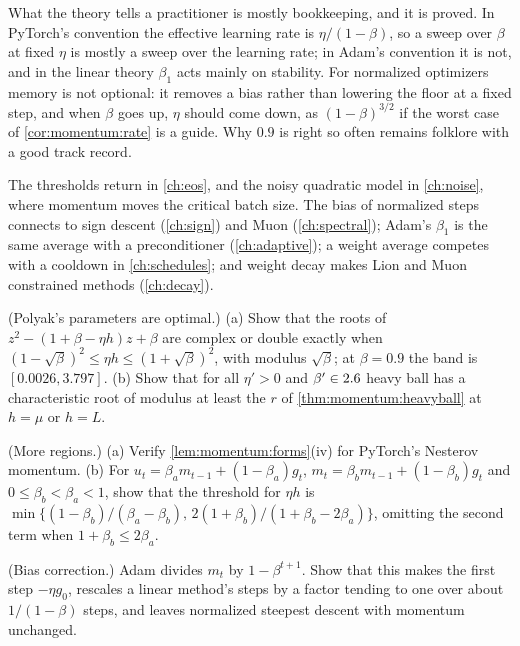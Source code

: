 \begin{refsection}
What the theory tells a practitioner is mostly bookkeeping, and it is proved. In PyTorch's convention the effective learning rate is $\eta/(1-\beta)$, so a sweep over $\beta$ at fixed $\eta$ is mostly a sweep over the learning rate; in Adam's convention it is not, and in the linear theory $\beta_1$ acts mainly on stability. For normalized optimizers memory is not optional: it removes a bias rather than lowering the floor at a fixed step, and when $\beta$ goes up, $\eta$ should come down, as $(1-\beta)^{3/2}$ if the worst case of \cref{cor:momentum:rate} is a guide. Why $0.9$ is right so often remains folklore with a good track record.

The thresholds return in \cref{ch:eos}, and the noisy quadratic model in \cref{ch:noise}, where momentum moves the critical batch size. The bias of normalized steps connects to sign descent (\cref{ch:sign}) and Muon (\cref{ch:spectral}); Adam's $\beta_1$ is the same average with a preconditioner (\cref{ch:adaptive}); a weight average competes with a cooldown in \cref{ch:schedules}; and weight decay makes Lion and Muon constrained methods (\cref{ch:decay}).

\begin{exercises}
\item \consolidation (Polyak's parameters are optimal.) (a) Show that the roots of $z^2-(1+\beta-\eta h)z+\beta$ are complex or double exactly when $(1-\sqrt\beta)^2\le\eta h\le(1+\sqrt\beta)^2$, with modulus $\sqrt\beta$; at $\beta=0.9$ the band is $[0.0026,3.797]$. (b) Show that for all $\eta'>0$ and $\beta'\in2.6$ heavy ball has a characteristic root of modulus at least the $r$ of \cref{thm:momentum:heavyball} at $h=\mu$ or $h=L$. \label{ex:momentum:optimal}

\item \consolidation (More regions.) (a) Verify \cref{lem:momentum:forms}(iv) for PyTorch's Nesterov momentum. (b) For $u_t=\beta_am_{t-1}+(1-\beta_a)g_t$, $m_t=\beta_bm_{t-1}+(1-\beta_b)g_t$ and $0\le\beta_b<\beta_a<1$, show that the threshold for $\eta h$ is $\min\{(1-\beta_b)/(\beta_a-\beta_b),\,2(1+\beta_b)/(1+\beta_b-2\beta_a)\}$, omitting the second term when $1+\beta_b\le2\beta_a$.\label{ex:momentum:regions}

\item \consolidation (Bias correction.) Adam divides $m_t$ by $1-\beta^{t+1}$. Show that this makes the first step $-\eta g_0$, rescales a linear method's steps by a factor tending to one over about $1/(1-\beta)$ steps, and leaves normalized steepest descent with momentum unchanged.\label{ex:momentum:bias}


\end{exercises}
\end{refsection}
